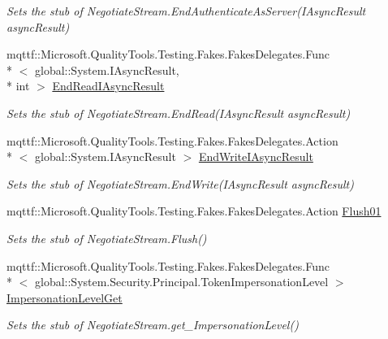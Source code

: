 \begin{DoxyCompactItemize}
\begin{DoxyCompactList}\small\item\em Sets the stub of Negotiate\-Stream.\-End\-Authenticate\-As\-Server(\-I\-Async\-Result async\-Result)\end{DoxyCompactList}\item 
mqttf\-::\-Microsoft.\-Quality\-Tools.\-Testing.\-Fakes.\-Fakes\-Delegates.\-Func\\*
$<$ global\-::\-System.\-I\-Async\-Result, \\*
int $>$ \hyperlink{class_system_1_1_net_1_1_security_1_1_fakes_1_1_stub_negotiate_stream_a0c894bc836548d20de2d44f1838a87e0}{End\-Read\-I\-Async\-Result}
\begin{DoxyCompactList}\small\item\em Sets the stub of Negotiate\-Stream.\-End\-Read(\-I\-Async\-Result async\-Result)\end{DoxyCompactList}\item 
mqttf\-::\-Microsoft.\-Quality\-Tools.\-Testing.\-Fakes.\-Fakes\-Delegates.\-Action\\*
$<$ global\-::\-System.\-I\-Async\-Result $>$ \hyperlink{class_system_1_1_net_1_1_security_1_1_fakes_1_1_stub_negotiate_stream_aaec3dd8627fbbdbf1ac9f92e53ea5a82}{End\-Write\-I\-Async\-Result}
\begin{DoxyCompactList}\small\item\em Sets the stub of Negotiate\-Stream.\-End\-Write(\-I\-Async\-Result async\-Result)\end{DoxyCompactList}\item 
mqttf\-::\-Microsoft.\-Quality\-Tools.\-Testing.\-Fakes.\-Fakes\-Delegates.\-Action \hyperlink{class_system_1_1_net_1_1_security_1_1_fakes_1_1_stub_negotiate_stream_a8b4b356d74be5d276b522c82b5c88733}{Flush01}
\begin{DoxyCompactList}\small\item\em Sets the stub of Negotiate\-Stream.\-Flush()\end{DoxyCompactList}\item 
mqttf\-::\-Microsoft.\-Quality\-Tools.\-Testing.\-Fakes.\-Fakes\-Delegates.\-Func\\*
$<$ global\-::\-System.\-Security.\-Principal.\-Token\-Impersonation\-Level $>$ \hyperlink{class_system_1_1_net_1_1_security_1_1_fakes_1_1_stub_negotiate_stream_a0561ce299850970805b4032d69f3db25}{Impersonation\-Level\-Get}
\begin{DoxyCompactList}\small\item\em Sets the stub of Negotiate\-Stream.\-get\-\_\-\-Impersonation\-Level()\end{DoxyCompactList}\item 

\end{DoxyCompactItemize}
